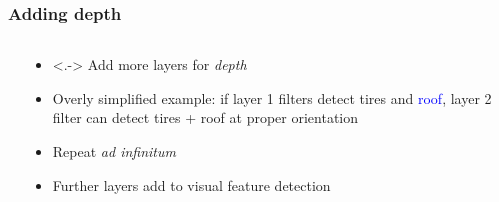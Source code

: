 \begin{frame}
    \frametitle{Adding depth}

    \begin{columns}
        \begin{column}{0.32\textwidth}
            
        \end{column}

        \begin{column}{0.68\textwidth}
            \begin{itemize}
                \item<.-> Add more layers for \emph{depth}
                \item<+-> Overly simplified example: if layer 1 filters detect \textcolor{Green4}{tires} and \textcolor{blue}{roof}, \alert{layer 2 filter} can detect tires + roof at proper orientation
                \item<6-> Repeat \emph{ad infinitum}
                \item<6-> Further layers add  to visual feature detection
            \end{itemize}
        \end{column}
    \end{columns}
\end{frame}

